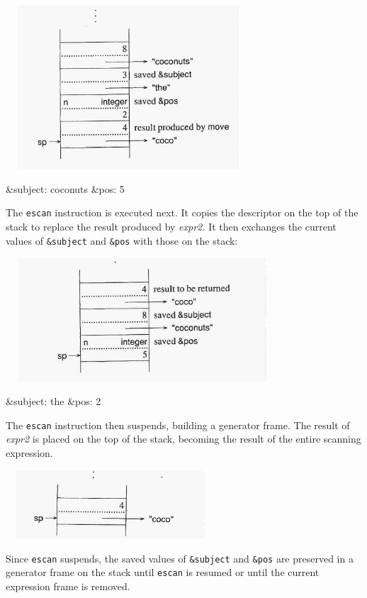 \ \  \includegraphics[width=3.3134in,height=2.398in]{ib-img/ib-img074.jpg} 

{\ttfamily\mdseries
\&subject: {\textquotedbl}coconuts{\textquotedbl}\newline
\&pos: 5}

The \texttt{escan} instruction is executed next. It copies the
descriptor on the top of the stack to replace the result produced by
\textit{expr2. }It then exchanges the current values of
\texttt{\&subject} and \texttt{\&pos} with those on the stack:

\ \  \includegraphics[width=3.7402in,height=1.8161in]{ib-img/ib-img075.jpg} 

{\ttfamily\mdseries
\&subject: {\textquotedbl}the{\textquotedbl}\newline
\&pos: 2}

The \texttt{escan} instruction then suspends, building a generator
frame. The result of \textit{expr2} is placed on the top of the stack,
becoming the result of the entire scanning expression.

\ \  \includegraphics[width=2.778in,height=1.0043in]{ib-img/ib-img076.jpg} 

Since \texttt{escan} suspends, the saved values of \texttt{\&subject}
and \texttt{\&pos} are preserved in a generator frame on the stack
until \texttt{escan} is resumed or until the current expression frame
is removed.

